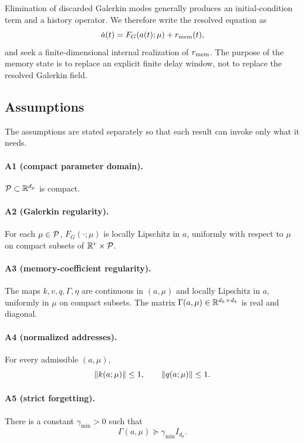 Elimination of discarded Galerkin modes generally produces an
initial-condition term and a history operator. We therefore write the
resolved equation as
\begin{equation}
 \dot a(t)=F_G(a(t);\mu)+r_{\mathrm{mem}}(t),
 \label{eq:resolved-closure}
\end{equation}
and seek a finite-dimensional internal realization of $r_{\mathrm{mem}}$. The
purpose of the memory state is to replace an explicit finite delay window,
not to replace the resolved Galerkin field.

\subsection{Assumptions}
\label{sec:assumptions}

The assumptions are stated separately so that each result can invoke only
what it needs.

\paragraph{A1 (compact parameter domain).}
$\mathcal{P}\subset\mathbb{R}^{d_\mu}$ is compact.

\paragraph{A2 (Galerkin regularity).}
For each $\mu\in\mathcal{P}$, $F_G(\cdot;\mu)$ is locally Lipschitz in $a$,
uniformly with respect to $\mu$ on compact subsets of $\mathbb{R}^r\times\mathcal{P}$.

\paragraph{A3 (memory-coefficient regularity).}
The maps $k,v,q,\Gamma,\eta$ are continuous in $(a,\mu)$ and locally
Lipschitz in $a$, uniformly in $\mu$ on compact subsets. The matrix
$\Gamma(a,\mu)\in\mathbb{R}^{d_k\times d_k}$ is real and diagonal.

\paragraph{A4 (normalized addresses).}
For every admissible $(a,\mu)$,
\begin{equation}
 \left\lVert k(a;\mu)\right\rVert\le1,\qquad \left\lVert q(a;\mu)\right\rVert\le1.
 \label{eq:address-bounds}
\end{equation}

\paragraph{A5 (strict forgetting).}
There is a constant $\gamma_{\min}>0$ such that
\begin{equation}
 \Gamma(a,\mu)\succeq\gamma_{\min}I_{d_k}.
 \label{eq:gamma-lower}
\end{equation}

